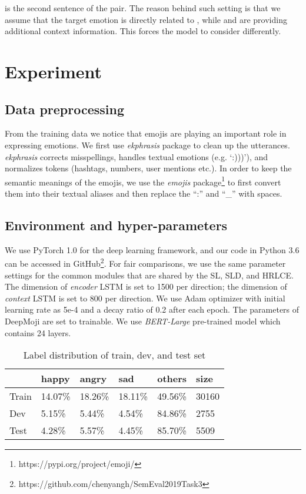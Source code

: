 \documentclass[11pt,a4paper]{article}
\begin{document}
is 
the second sentence of the pair.
The reason behind such setting is that we assume that the target emotion 
 is directly related to , while  and  are providing additional context information. 
This forces the model to consider  differently. 

\section{Experiment}

\subsection{Data preprocessing}
From the training data we notice that emojis are playing an important role in expressing emotions. We first use \emph{ekphrasis} package  \cite{baziotis-pelekis-doulkeridis:2017:SemEval2} to clean up the utterances. \emph{ekphrasis} corrects misspellings, handles textual emotions (e.g. `:)))'), and normalizes tokens (hashtags, numbers, user mentions etc.). In order to keep the semantic meanings of the emojis, we use the \emph{emojis} package\footnote{https://pypi.org/project/emoji/} to first convert them into their textual aliases and then replace the ``:'' and ``\_'' with spaces. 

\subsection{Environment and hyper-parameters}
We use PyTorch 1.0 for the deep learning framework, and our code in Python 3.6 can be accessed in GitHub\footnote{https://github.com/chenyangh/SemEval2019Task3}.
For fair comparisons, we use the same parameter settings for the common modules that are shared by the SL, SLD, and HRLCE. The dimension of \emph{encoder} LSTM is set to 1500 per direction; the dimension of \emph{context} LSTM is set to 800 per direction. We use Adam optimizer with initial learning rate as 5e-4 and a decay ratio of 0.2 after each epoch. 
The parameters of DeepMoji are set to trainable. We use \textit{BERT-Large} pre-trained model which contains 24 layers. 


\begin{table}[h]
\centering
    \setlength\tabcolsep{2.7pt}
    \begin{tabular}{l|llll|l} \hline  \hline
              & happy   & angry   & sad     & others   & size   \\  \hline
        Train & 14.07\% & 18.26\% & 18.11\% & 49.56\%  & 30160  \\
        Dev   & 5.15\%  & 5.44\%  & 4.54\%  & 84.86\%  & 2755 \\
        Test  & 4.28\%  & 5.57\%  & 4.45\%  & 85.70\%  & 5509 \\  \hline \hline
    \end{tabular}
\caption{Label distribution of train, dev, and test set}
    \label{tab:data_dist}
\end{table}
\end{document}
